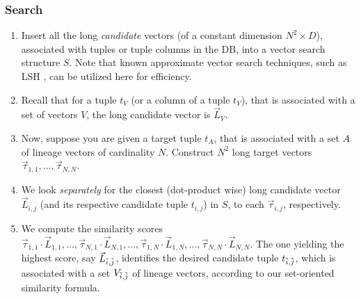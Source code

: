 \subsubsection{Search}
\begin{enumerate}
    \item Insert all the long \textit{candidate} vectors (of a constant dimension $N^2 \times D$), associated with tuples or tuple columns in the DB, into a vector search structure $S$. Note that known approximate vector search techniques, such as LSH \cite{lsh}, can be utilized here for efficiency.
    \item Recall that for a tuple $t_V$ (or a column of a tuple $t_V$), that is associated with a set of vectors $V$, the long candidate vector is $\vec{L}_V$.
    \item Now, suppose you are given a target tuple $t_A$, that is associated with a set $A$ of lineage vectors of cardinality $N$. Construct $N^2$ long target vectors $\vec{\tau}_{1, 1}, ..., \vec{\tau}_{N, N}$. 
    \item We look \textit{separately} for the closest (dot-product wise) long candidate vector $\vec{L}_{{i, j}}$ (and its respective candidate tuple $t_{{i, j}}$) in $S$, to each $\vec{\tau}_{i, j}$, respectively.
    \item We compute the similarity scores $\vec{\tau}_{1, 1} \cdot \vec{L}_{{1, 1}}, ..., \vec{\tau}_{N, 1} \cdot \vec{L}_{{N, 1}}, ..., \vec{\tau}_{1, N} \cdot \vec{L}_{{1, N}}, ..., \vec{\tau}_{N, N} \cdot \vec{L}_{{N, N}}$. The one yielding the highest score, say $\vec{L}_{{{\Tilde{i}, {\Tilde{j}}}}}$, identifies the desired candidate tuple $t_{{{\Tilde{i}, {\Tilde{j}}}}}$, which is associated with a set $V_{{\Tilde{i}, {\Tilde{j}}}}$ of lineage vectors, according to our set-oriented similarity formula.
\end{enumerate}

